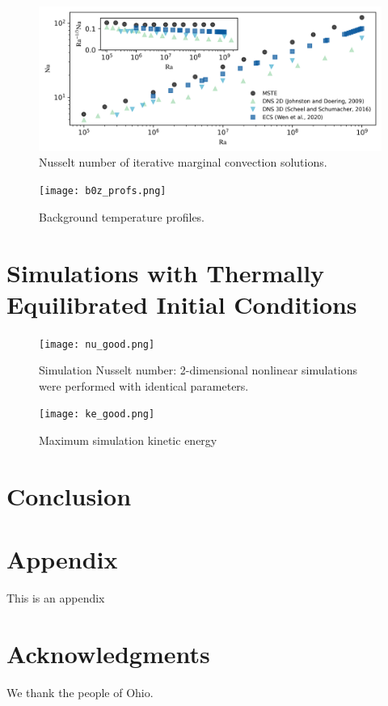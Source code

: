 \documentclass[reprint,amsmath,amssymb,aps]{revtex4-1}
\begin{document}
\begin{figure}[h]
    \centering
    \includegraphics[width=7.1in]{nu_ra.PNG}
    \caption{Nusselt number of iterative marginal convection solutions.}
    \label{fig:nu_vs_ra}
\end{figure}
\begin{figure}[h]
    \centering
    \texttt{[image: b0z\_profs.png]}
    \caption{Background temperature profiles.}
    \label{fig:my_label}
\end{figure}

 \newpage
\section{Simulations with Thermally Equilibrated Initial Conditions}

\begin{figure}[h]
    \centering
    \texttt{[image: nu\_good.png]}
    \caption{Simulation Nusselt number: 2-dimensional nonlinear simulations were performed with identical parameters.}
    \label{fig:my_label}
\end{figure}

\begin{figure}[h]
    \centering
    \texttt{[image: ke\_good.png]}
    \caption{Maximum simulation kinetic energy}
    \label{fig:my_label}
\end{figure}


\section{Conclusion}\label{sec:conclusion}

\section*{Appendix}
This is an appendix

\section*{Acknowledgments}
We thank the people of Ohio.


\end{document}
